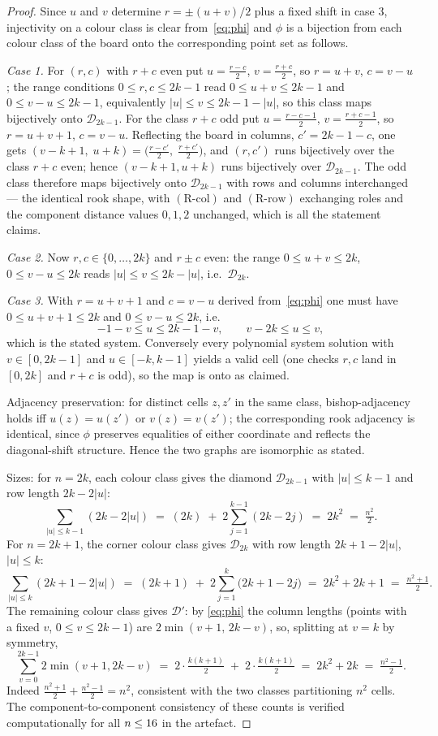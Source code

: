 \documentclass[12pt]{article}
\theoremstyle{definition}
\newcommand{\DD}{\mathcal{D}}
\newcommand{\DDs}{\mathcal{D}'}
\newcommand{\RRc}{\ensuremath{\mathrm{(R\text{-}col)}}}
\newcommand{\RRr}{\ensuremath{\mathrm{(R\text{-}row)}}}
\begin{document}
\begin{proof}
Since $u$ and $v$ determine $r=\pm(u+v)/2$ plus a fixed shift in case 3, injectivity on a colour class is clear from~\eqref{eq:phi} and $\phi$ is a bijection from each colour class of the board onto the corresponding point set as follows.

\emph{Case 1.} For $(r,c)$ with $r+c$ even put $u=\frac{r-c}2$, $v=\frac{r+c}2$, so $r=u+v$, $c=v-u$; the range conditions $0\le r,c\le 2k-1$ read $0\le u+v\le 2k-1$ and $0\le v-u\le 2k-1$, equivalently $|u|\le v\le 2k-1-|u|$, so this class maps bijectively onto $\DD_{2k-1}$. For the class $r+c$ odd put $u=\frac{r-c-1}2$, $v=\frac{r+c-1}2$, so $r=u+v+1$, $c=v-u$. Reflecting the board in columns, $c'=2k-1-c$, one gets $(v-k+1,\;u+k)=\bigl(\tfrac{r-c'}2,\;\tfrac{r+c'}2\bigr)$, and $(r,c')$ runs bijectively over the class $r+c$ even; hence $(v-k+1,u+k)$ runs bijectively over $\DD_{2k-1}$. The odd class therefore maps bijectively onto $\DD_{2k-1}$ with rows and columns interchanged — the identical rook shape, with \RRc{} and \RRr{} exchanging roles and the component distance values $0,1,2$ unchanged, which is all the statement claims.

\emph{Case 2.} Now $r,c\in\{0,\dots,2k\}$ and $r\pm c$ even: the range $0\le u+v\le 2k$, $0\le v-u\le 2k$ reads $|u|\le v\le 2k-|u|$, i.e.\ $\DD_{2k}$.

\emph{Case 3.} With $r=u+v+1$ and $c=v-u$ derived from~\eqref{eq:phi} one must have $0\le u+v+1\le 2k$ and $0\le v-u\le 2k$, i.e.
\[
-1-v\le u\le 2k-1-v,\qquad v-2k\le u\le v,
\]
which is the stated system. Conversely every polynomial system solution with $v\in[0,2k-1]$ and $u\in[-k,k-1]$ yields a valid cell (one checks $r,c$ land in $[0,2k]$ and $r+c$ is odd), so the map is onto as claimed.

Adjacency preservation: for distinct cells $z,z'$ in the same class, bishop-adjacency holds iff $u(z)=u(z')$ or $v(z)=v(z')$; the corresponding rook adjacency is identical, since $\phi$ preserves equalities of either coordinate and reflects the diagonal-shift structure. Hence the two graphs are isomorphic as stated.

Sizes: for $n=2k$, each colour class gives the diamond $\DD_{2k-1}$ with $|u|\le k-1$ and row length $2k-2|u|$:
\[
\sum_{|u|\le k-1}(2k-2|u|)\;=\;(2k)\;+\;2\sum_{j=1}^{k-1}(2k-2j)\;=\;2k^2\;=\;\tfrac{n^2}{2}.
\]
For $n=2k+1$, the corner colour class gives $\DD_{2k}$ with row length $2k+1-2|u|$, $|u|\le k$:
\[
\sum_{|u|\le k}(2k+1-2|u|)\;=\;(2k+1)\;+\;2\sum_{j=1}^{k}\bigl(2k+1-2j\bigr)\;=\;2k^2+2k+1\;=\;\tfrac{n^2+1}{2}.
\]
The remaining colour class gives $\DDs$: by \eqref{eq:phi} the column lengths (points with a fixed $v$, $0\le v\le 2k-1$) are $2\min(v+1,\,2k-v)$, so, splitting at $v=k$ by symmetry,
\[
\sum_{v=0}^{2k-1}2\min(v+1,2k-v)\;=\;2\cdot\tfrac{k(k+1)}{2}\;+\;2\cdot\tfrac{k(k+1)}{2}\;=\;2k^2+2k\;=\;\tfrac{n^2-1}{2}.
\]
Indeed $\tfrac{n^2+1}{2}+\tfrac{n^2-1}{2}=n^2$, consistent with the two classes partitioning $n^2$ cells. The component-to-component consistency of these counts is verified computationally for all $n\le16$ in the artefact.
\end{proof}
\end{document}
